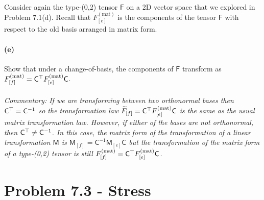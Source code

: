 \documentclass{article}
\def\mat{(\textrm{mat})}
\begin{document}
\phline
\paragraph{}
Consider again the type-(0,2) tensor $\mathsf{F}$ on a 2D vector space that we explored in Problem 7.1(d).  Recall that ${F}^{\mat}_{[e]}$ is the
components of the tensor $\mathsf{F}$ with respect to the old basis arranged in matrix form.

\paragraph{(e)}	\extrapart
Show that under a change-of-basis, the components of $\mathsf{F}$ transform as ${F}^{\mat}_{[f]} = \mathsf{C}^{\T}{F}^{\mat}_{[e]}\mathsf{C}$.

\paragraph{}
\noindent\textit{Commentary:   If we are transforming between two orthonormal bases then $\mathsf{C}^{\top}=\mathsf{C}^{-1}$ so the transformation law 
$\widetilde{F}_{[f]} = \mathsf{C}^{\T}{F}^{\mat}_{[e]}\mathsf{C}$ is the same as the usual matrix transformation law.  However, if either of the bases are
\emph{not} orthonormal, then $\mathsf{C}^{\top}\neq\mathsf{C}^{-1}$.  In this case, the matrix form of the transformation of a linear transformation $\mathsf{M}$
is $\mathsf{M}_{[f]} = \mathsf{C}^{-1}\mathsf{M}_{[e]}\mathsf{C}$ but the transformation of the \emph{matrix form} of a type-(0,2) tensor is still 
${F}^{\mat}_{[f]} = \mathsf{C}^{\T}{F}^{\mat}_{[e]}\mathsf{C}$.}


\bigskip
\dphline
\pagebreak
\section*{Problem 7.3 - Stress\footnotemark}
\end{document}
